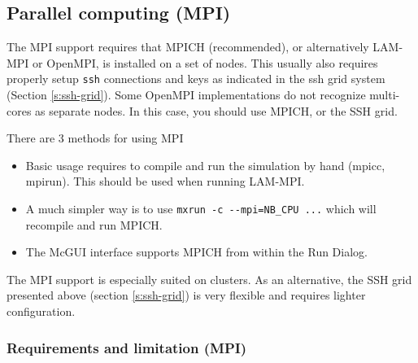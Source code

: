 \subsection{Parallel computing (MPI)}
\label{s:mpi}
The MPI support requires that MPICH (recommended), or alternatively LAM-MPI or 
  OpenMPI, is installed on a set of nodes. This usually also requires properly 
  setup \texttt{ssh} connections and keys as indicated in the ssh grid system 
  (Section \ref{s:ssh-grid}). Some OpenMPI implementations do not recognize 
  multi-cores as separate nodes. In this case, you should use MPICH, or the SSH grid.

There are 3 methods for using MPI
\begin{itemize}
\item Basic usage requires to compile and run the simulation by hand (mpicc, mpirun). 
  This should be used when running LAM-MPI.
\item A much simpler way is to use \verb+mxrun -c --mpi=NB_CPU ...+ which will 
  recompile and run MPICH.
\item The McGUI interface supports MPICH from within the Run Dialog.
\end{itemize}

The MPI support is especially suited on clusters. As an alternative, the SSH grid 
presented above (section \ref{s:ssh-grid}) is very flexible and requires lighter 
configuration.

\subsubsection{Requirements and limitation (MPI)}

